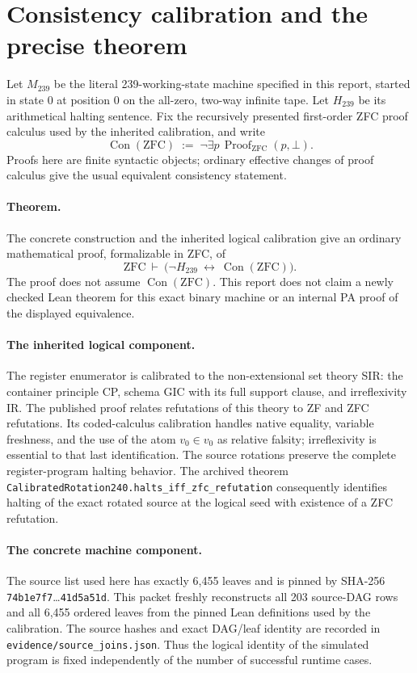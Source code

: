 \section{Consistency calibration and the precise theorem}
\label{sec:calibration239}

Let $M_{239}$ be the literal 239-working-state machine specified in this
report, started in state $0$ at position $0$ on the all-zero, two-way infinite
tape. Let $H_{239}$ be its arithmetical halting sentence. Fix the recursively
presented first-order ZFC proof calculus used by the inherited calibration,
and write
\[
 \operatorname{Con}(\mathrm{ZFC})\;:=\;
 \neg\exists p\,\operatorname{Proof}_{\mathrm{ZFC}}(p,\bot).
\]
Proofs here are finite syntactic objects; ordinary effective changes of
proof calculus give the usual equivalent consistency statement.

\paragraph{Theorem.}
The concrete construction and the inherited logical calibration give an
ordinary mathematical proof, formalizable in ZFC, of
\[
 \mathrm{ZFC}\ \vdash\
 \bigl(\neg H_{239}\ \longleftrightarrow\
             \operatorname{Con}(\mathrm{ZFC})\bigr).
\]
The proof does not assume $\operatorname{Con}(\mathrm{ZFC})$.
This report does not claim a newly checked Lean theorem for this exact
binary machine or an internal PA proof of the displayed equivalence.

\paragraph{The inherited logical component.}
The register enumerator is calibrated to the non-extensional set theory
SIR: the container principle CP, schema GIC with its full
support clause, and irreflexivity IR. The published proof relates refutations
of this theory to ZF and ZFC refutations. Its coded-calculus calibration
handles native equality, variable freshness, and the use of the atom
$v_0\in v_0$ as relative falsity; irreflexivity is essential to that last
identification. The source rotations preserve the complete register-program
halting behavior. The archived theorem
\texttt{CalibratedRotation240.halts\_iff\_zfc\_refutation} consequently
identifies halting of the exact rotated source at the logical seed with
existence of a ZFC refutation.\cite{m254,source240,cal240}

\paragraph{The concrete machine component.}
The source list used here has exactly 6,455 leaves and is pinned by SHA-256
\texttt{74b1e7f7}\ldots\texttt{41d5a51d}. This packet freshly reconstructs
all 203 source-DAG rows and all 6,455 ordered leaves from the pinned Lean
definitions used by the calibration. The source hashes and exact DAG/leaf
identity are recorded in \texttt{evidence/source\_joins.json}. Thus the
logical identity of the simulated program is fixed independently of the
number of successful runtime cases.\cite{source240}

